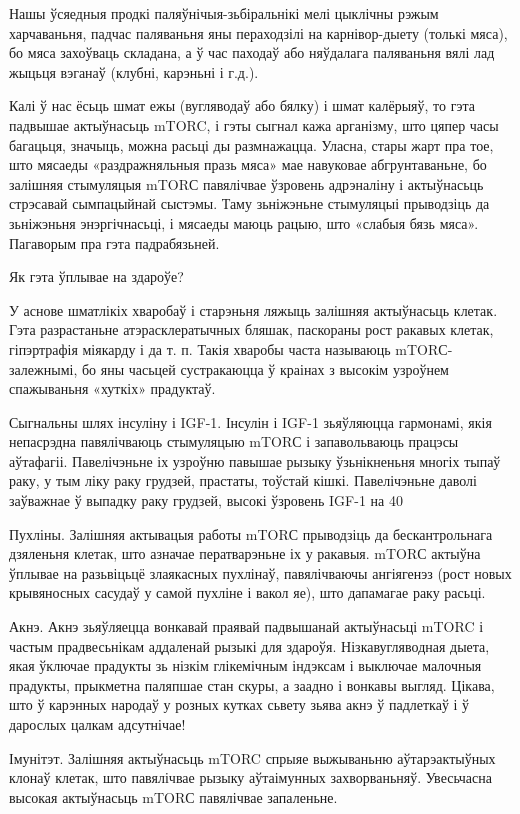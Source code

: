 Нашы ўсяедныя продкі паляўнічыя-зьбіральнікі мелі цыклічны рэжым харчаваньня, падчас паляваньня яны пераходзілі на карнівор-дыету (толькі мяса), бо мяса захоўваць складана, а ў час паходаў або няўдалага паляваньня вялі лад жыцьця вэганаў (клубні, карэньні і г.д.).

Калі ў нас ёсьць шмат ежы (вугляводаў або бялку) і шмат калёрыяў, то гэта падвышае актыўнасьць mTORC, і гэты сыгнал кажа арганізму, што цяпер часы багацьця, значыць, можна расьці ды размнажацца. Уласна, стары жарт пра тое, што мясаеды «раздражняльныя празь мяса» мае навуковае абгрунтаваньне, бо залішняя стымуляцыя mTORС павялічвае ўзровень адрэналіну і актыўнасьць стрэсавай сымпацыйнай сыстэмы. Таму зьніжэньне стымуляцыі прыводзіць да зьніжэньня энэргічнасьці, і мясаеды маюць рацыю, што «слабыя бязь мяса». Пагаворым пра гэта падрабязьней.

Як гэта ўплывае на здароўе?

У аснове шматлікіх хваробаў і старэньня ляжыць залішняя актыўнасьць клетак. Гэта разрастаньне атэрасклератычных бляшак, паскораны рост ракавых клетак, гіпэртрафія міякарду і да т. п. Такія хваробы часта называюць mTORС-залежнымі, бо яны часьцей сустракаюцца ў краінах з высокім узроўнем спажываньня «хуткіх» прадуктаў.

Сыгнальны шлях інсуліну і IGF-1.
Інсулін і IGF-1 зьяўляюцца гармонамі, якія непасрэдна павялічваюць стымуляцыю mTORС і запавольваюць працэсы аўтафагіі. Павелічэньне іх узроўню павышае рызыку ўзьнікненьня многіх тыпаў раку, у тым ліку раку грудзей, прастаты, тоўстай кішкі. Павелічэньне даволі заўважнае ў выпадку раку грудзей, высокі ўзровень IGF-1 на 40%

Пухліны.
Залішняя актывацыя работы mTORС прыводзіць да бескантрольнага дзяленьня клетак, што азначае ператварэньне іх у ракавыя. mTORС актыўна ўплывае на разьвіцьцё злаякасных пухлінаў, павялічваючы ангіягенэз (рост новых крывяносных сасудаў у самой пухліне і вакол яе), што дапамагае раку расьці.

Акнэ.
Акнэ зьяўляецца вонкавай праявай падвышанай актыўнасьці mTORC і частым прадвесьнікам аддаленай рызыкі для здароўя. Нізкавугляводная дыета, якая ўключае прадукты зь нізкім глікемічным індэксам і выключае малочныя прадукты, прыкметна паляпшае стан скуры, а заадно і вонкавы выгляд. Цікава, што ў карэнных народаў у розных кутках сьвету зьява акнэ ў падлеткаў і ў дарослых цалкам адсутнічае!

Імунітэт.
Залішняя актыўнасьць mTORC спрыяе выжываньню аўтарэактыўных клонаў клетак, што павялічвае рызыку аўтаімунных захворваньняў. Увесьчасна высокая актыўнасьць mTORС павялічвае запаленьне.


